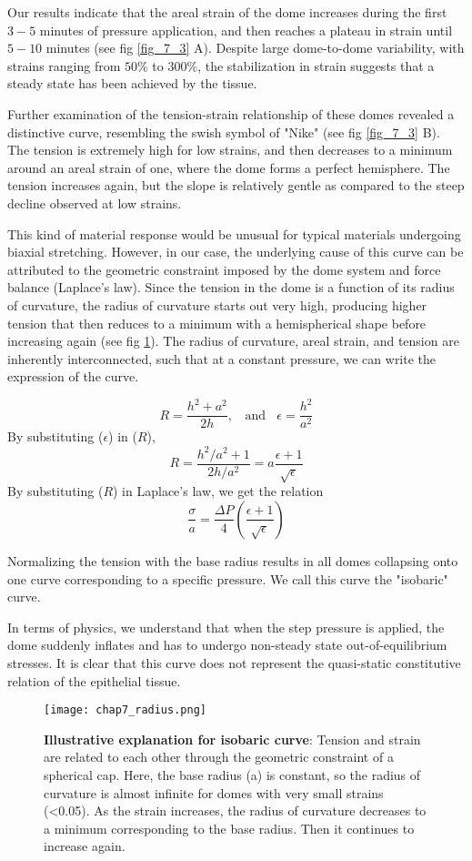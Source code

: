 Our results indicate that the areal strain of the dome increases during the first $3-5$ minutes of pressure application, and then reaches a plateau in strain until $5-10$ minutes (see fig \ref{fig_7_3} A). Despite large dome-to-dome variability, with strains ranging from $50\%$ to $300\%$, the stabilization in strain suggests that a steady state has been achieved by the tissue.

Further examination of the tension-strain relationship of these domes revealed a distinctive curve, resembling the swish symbol of "Nike" (see fig \ref{fig_7_3} B). The tension is extremely high for low strains, and then decreases to a minimum around an areal strain of one, where the dome forms a perfect hemisphere. The tension increases again, but the slope is relatively gentle as compared to the steep decline observed at low strains.

This kind of material response would be unusual for typical materials undergoing biaxial stretching. However, in our case, the underlying cause of this curve can be attributed to the geometric constraint imposed by the dome system and force balance (Laplace's law). Since the tension in the dome is a function of its radius of curvature, the radius of curvature starts out very high, producing higher tension that then reduces to a minimum with a hemispherical shape before increasing again (see fig \ref{fig_7_4}). The radius of curvature, areal strain, and tension are inherently interconnected, such that at a constant pressure, we can write the expression of the curve.

$$ R = \frac{h^2 + a^2}{2h}, \ \ \ \ \text{and} \ \ \ \ \epsilon = \frac{h^2}{a^2}$$
By substituting ($\epsilon$) in ($R$),
$$ R = \frac{h^2/a^2 + 1}{2h/a^2} = a\frac{\epsilon + 1}{\sqrt{\epsilon}}$$
By substituting ($R$) in Laplace's law, we get the relation
$$ \frac{\sigma}{a} = \frac{\Delta P}{4} \left( \frac{\epsilon + 1}{\sqrt{\epsilon}} \right)$$

Normalizing the tension with the base radius results in all domes collapsing onto one curve corresponding to a specific pressure. We call this curve the "isobaric" curve.

In terms of physics, we understand that when the step pressure is applied, the dome suddenly inflates and has to undergo non-steady state out-of-equilibrium stresses. It is clear that this curve does not represent the quasi-static constitutive relation of the epithelial tissue.

\begin{figure}
	\centering
	\texttt{[image: chap7\_radius.png]}
	\caption{\label{fig_7_4} \textbf{Illustrative explanation for isobaric curve}: Tension and strain are related to each other through the geometric constraint of a spherical cap. Here, the base radius (a) is constant, so the radius of curvature is almost infinite for domes with very small strains (<0.05). As the strain increases, the radius of curvature decreases to a minimum corresponding to the base radius. Then it continues to increase again.	
	}
\end{figure}



